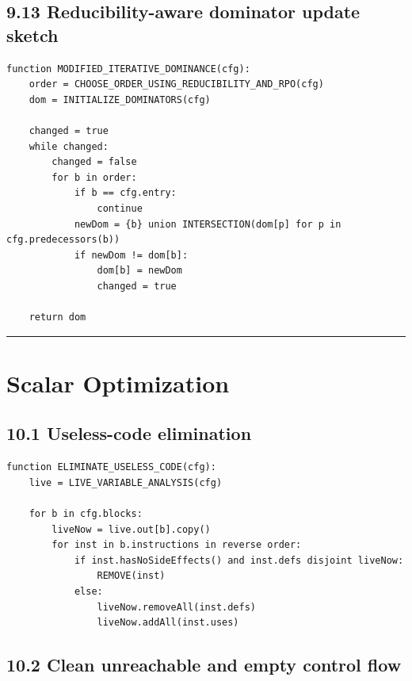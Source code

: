 \documentclass[10pt,letterpaper]{article}
\begin{document}
\subsection*{9.13 Reducibility-aware dominator update sketch}

\begin{verbatim}
function MODIFIED_ITERATIVE_DOMINANCE(cfg):
    order = CHOOSE_ORDER_USING_REDUCIBILITY_AND_RPO(cfg)
    dom = INITIALIZE_DOMINATORS(cfg)

    changed = true
    while changed:
        changed = false
        for b in order:
            if b == cfg.entry:
                continue
            newDom = {b} union INTERSECTION(dom[p] for p in cfg.predecessors(b))
            if newDom != dom[b]:
                dom[b] = newDom
                changed = true

    return dom
\end{verbatim}

\medskip\hrule\medskip

\clearpage
\section{Scalar Optimization}

\subsection*{10.1 Useless-code elimination}

\begin{verbatim}
function ELIMINATE_USELESS_CODE(cfg):
    live = LIVE_VARIABLE_ANALYSIS(cfg)

    for b in cfg.blocks:
        liveNow = live.out[b].copy()
        for inst in b.instructions in reverse order:
            if inst.hasNoSideEffects() and inst.defs disjoint liveNow:
                REMOVE(inst)
            else:
                liveNow.removeAll(inst.defs)
                liveNow.addAll(inst.uses)
\end{verbatim}

\subsection*{10.2 Clean unreachable and empty control flow}
\end{document}
